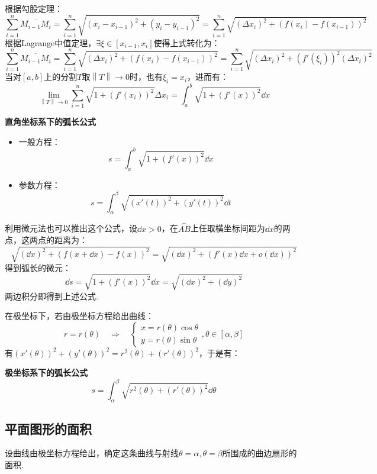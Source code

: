 根据勾股定理：
\[\sum_{i=1}^{n}\overline{M_{i-1}M_i} = \sum_{i=1}^{n}\sqrt{(x_i-x_{i-1})^2 + (y_i-y_{i-1})^2} = \sum_{i=1}^{n}\sqrt{(\Delta x_i)^2 + (f(x_i)-f(x_{i-1}))^2}\]
根据Lagrange中值定理，$\exists \xi \in [x_{i-1},x_i]$使得上式转化为：
\[\sum_{i=1}^{n}\overline{M_{i-1}M_i} = \sum_{i=1}^{n}\sqrt{(\Delta x_i)^2 + (f(x_i)-f(x_{i-1}))^2} = \sum_{i=1}^{n}\sqrt{(\Delta x_i)^2 + (f'(\xi_i))^2(\Delta x_i)^2}\]
当对$[a,b]$上的分割$T$取$\left\|T\right\|\to 0$时，也有$\xi_i=x_i$，进而有：
\[\lim_{\left\|T\right\|\to 0}\sum_{i=1}^{n}\sqrt{1+(f'(x_i))^2}\Delta x_i = \int_{a}^{b}\sqrt{1+(f'(x))^2}\dd{x}\]
\begin{theorem}
    \textbf{直角坐标系下的弧长公式}
    \begin{itemize}
        \item 一般方程：
        \[s = \int_{a}^{b}\sqrt{1+(f'(x))^2}\dd{x}\]
        \item 参数方程：
        \[s = \int_{\alpha}^{\beta}\sqrt{(x'(t))^2 + (y'(t))^2}\dd{t}\]
    \end{itemize}
\end{theorem}
利用微元法也可以推出这个公式，设$\dd{x}>0$，在$\overset{\frown}{AB}$上任取横坐标间距为$\dd{x}$的两点，这两点的距离为：
\[\sqrt{(\dd{x})^2 + (f(x+\dd{x}) - f(x))^2} = \sqrt{(\dd{x})^2 + (f'(x)\dd{x} + o(\dd{x}))^2}\]
得到弧长的微元：
\[\dd{s} = \sqrt{1+(f'(x))^2}\dd{x} = \sqrt{(\dd{x})^2 + (\dd{y})^2}\]
两边积分即得到上述公式.

在极坐标下，若由极坐标方程给出曲线：
\[r=r(\theta) \quad\Rightarrow\quad \begin{cases}
    x = r(\theta)\cos\theta\\
    y = r(\theta)\sin\theta
\end{cases},\theta\in[\alpha,\beta]\]
有$(x'(\theta))^2 + (y'(\theta))^2 = r^2(\theta) + (r'(\theta))^2$，于是有：
\begin{theorem}
    \textbf{极坐标系下的弧长公式}
    \[s = \int_{\alpha}^{\beta}\sqrt{r^2(\theta) + (r'(\theta))^2}\dd{\theta}\]
\end{theorem}


\subsection{平面图形的面积}
设曲线由极坐标方程给出，确定这条曲线与射线$\theta=\alpha,\theta=\beta$所围成的曲边扇形的面积.

